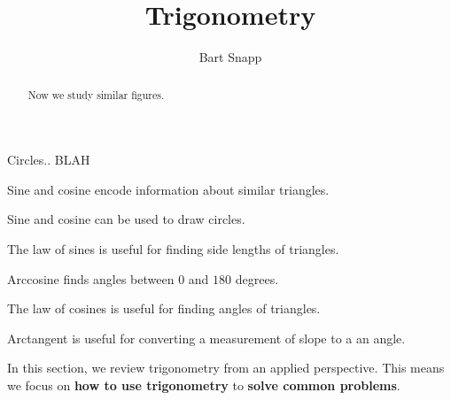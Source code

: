 \documentclass[handout,nooutcomes,noauthor]{ximera}
\title{Trigonometry}
\author{Bart Snapp}
\begin{document}
\begin{abstract}
  Now we study similar figures.
\end{abstract}
\maketitle


\begin{listSectionOutcomes}
\item Circles.. BLAH 
\item Sine and cosine encode information about similar triangles.
\item Sine and cosine can be used to draw circles.
\item The law of sines is useful for finding side lengths of
  triangles.
\item Arccosine finds angles between $0$ and $180$ degrees.
\item The law of cosines is useful for finding angles of triangles.
\item Arctangent is useful for converting a measurement of slope to a
  an angle.
\end{listSectionOutcomes}


In this section, we review trigonometry from an applied
perspective. This means we focus on \textbf{how to use trigonometry}
to \textbf{solve common problems}.
\end{document}
